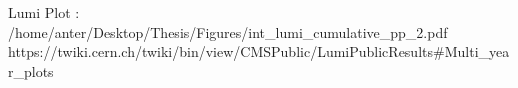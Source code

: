Lumi Plot : /home/anter/Desktop/Thesis/Figures/int_lumi_cumulative_pp_2.pdf https://twiki.cern.ch/twiki/bin/view/CMSPublic/LumiPublicResults#Multi_year_plots
